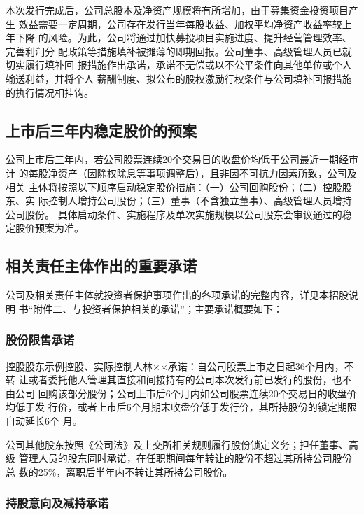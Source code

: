 本次发行完成后，公司总股本及净资产规模将有所增加，由于募集资金投资项目产生
效益需要一定周期，公司存在发行当年每股收益、加权平均净资产收益率较上年下降
的风险。为此，公司将通过加快募投项目实施进度、提升经营管理效率、完善利润分
配政策等措施填补被摊薄的即期回报。公司董事、高级管理人员已就切实履行填补回
报措施作出承诺，承诺不无偿或以不公平条件向其他单位或个人输送利益，并将个人
薪酬制度、拟公布的股权激励行权条件与公司填补回报措施的执行情况相挂钩。

\subsection{上市后三年内稳定股价的预案}

公司上市后三年内，若公司股票连续20个交易日的收盘价均低于公司最近一期经审计
的每股净资产（因除权除息等事项调整后），且非因不可抗力因素所致，公司及相关
主体将按照以下顺序启动稳定股价措施：（一）公司回购股份；（二）控股股东、实
际控制人增持公司股份；（三）董事（不含独立董事）、高级管理人员增持公司股份。
具体启动条件、实施程序及单次实施规模以公司股东会审议通过的稳定股价预案为准。

\subsection{相关责任主体作出的重要承诺}

公司及相关责任主体就投资者保护事项作出的各项承诺的完整内容，详见本招股说明
书``附件二、与投资者保护相关的承诺''；主要承诺概要如下：

\subsubsection{股份限售承诺}

控股股东示例控股、实际控制人林××承诺：自公司股票上市之日起36个月内，不转
让或者委托他人管理其直接和间接持有的公司本次发行前已发行的股份，也不由公司
回购该部分股份；公司上市后6个月内如公司股票连续20个交易日的收盘价均低于发
行价，或者上市后6个月期末收盘价低于发行价，其所持股份的锁定期限自动延长6个
月。

公司其他股东按照《公司法》及上交所相关规则履行股份锁定义务；担任董事、高级
管理人员的股东同时承诺，在任职期间每年转让的股份不超过其所持公司股份总
数的25\%，离职后半年内不转让其所持公司股份。

\subsubsection{持股意向及减持承诺}

